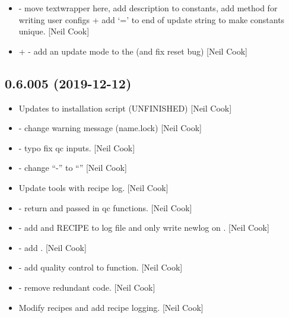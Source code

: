 \documentclass[a4paper,10pt,english]{report}
\begin{document}
\begin{itemize}
\item {} 
 - move textwrapper here, add
description to constants, add  method for writing user
configs + add ‘=’ to end of update string to make constants unique.
{[}Neil Cook{]}

\item {} 
 +  - add an update mode to the
 (and fix reset bug) {[}Neil Cook{]}

\end{itemize}


\subsection{0.6.005 (2019-12-12)}
\label{\detokenize{misc/changelog:id13}}\begin{itemize}
\item {} 
Updates to installation script (UNFINISHED) {[}Neil Cook{]}

\item {} 
 - change warning message (name.lock) {[}Neil Cook{]}

\item {} 
 - typo fix qc inputs. {[}Neil Cook{]}

\item {} 
 - change “-” to “\textendash{}” {[}Neil Cook{]}

\item {} 
Update tools with recipe log. {[}Neil Cook{]}

\item {} 
 - return  and passed in qc
functions. {[}Neil Cook{]}

\item {} 
 - add  and RECIPE to log file and only write
newlog on . {[}Neil Cook{]}

\item {} 
 - add . {[}Neil Cook{]}

\item {} 
 - add quality control to function.
{[}Neil Cook{]}

\item {} 
 - remove redundant code. {[}Neil Cook{]}

\item {} 
Modify recipes and add recipe logging. {[}Neil Cook{]}

\end{itemize}
\end{document}
